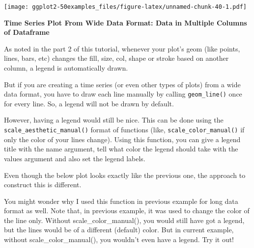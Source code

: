 \documentclass[a4paper]{article}
\begin{document}
\texttt{[image: ggplot2-50examples\_files/figure-latex/unnamed-chunk-40-1.pdf]}
\newpage

\textbf{Time Series Plot From Wide Data Format: Data in Multiple Columns
of Dataframe}

As noted in the part 2 of this tutorial, whenever your plot's geom (like
points, lines, bars, etc) changes the fill, size, col, shape or stroke
based on another column, a legend is automatically drawn.

But if you are creating a time series (or even other types of plots)
from a wide data format, you have to draw each line manually by calling
\texttt{geom\_line()} once for every line. So, a legend will not be
drawn by default.

However, having a legend would still be nice. This can be done using the
\texttt{scale\_aesthetic\_manual()} format of functions (like,
\texttt{scale\_color\_manual()} if only the color of your lines change).
Using this function, you can give a legend title with the name argument,
tell what color the legend should take with the values argument and also
set the legend labels.

Even though the below plot looks exactly like the previous one, the
approach to construct this is different.

You might wonder why I used this function in previous example for long
data format as well. Note that, in previous example, it was used to
change the color of the line only. Without scale\_color\_manual(), you
would still have got a legend, but the lines would be of a different
(default) color. But in current example, without scale\_color\_manual(),
you wouldn't even have a legend. Try it out!
\end{document}
